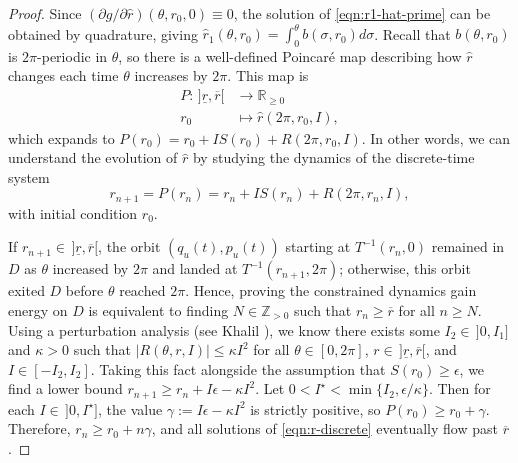 \documentclass[journal,twoside,web, twocolumn,draftcls]{ieeecolor}
\begin{document}
\begin{proof}
    Since \((\partial g/\partial \hat{r})(\theta,r_0,0) \equiv 0\),
    the solution of \eqref{eqn:r1-hat-prime} can be obtained by
    quadrature, giving
    \(\hat{r}_1(\theta,r_0) = \int_0^\theta b(\sigma,r_0)d\sigma\).
    Recall that \(b(\theta,r_0)\) is \(2\pi\)-periodic in
    \(\theta\), so there is a well-defined Poincar\'{e} map describing
    how \(\hat{r}\) changes each time \(\theta\) increases by \(2\pi\).
    This map is 
    \begin{align}\label{eqn:poincare-map}
        P : \, ]\underline{r},\overline{r}[ &\to \mathbb{R}_{\geq 0} \\
        r_0 &\mapsto \hat{r}(2\pi,r_0,I) \nonumber
        ,
    \end{align}
    which expands to \(P(r_0) = r_0 + IS(r_0) + R(2\pi,r_0,I)\).
    In other words, we can understand the evolution of \(\hat{r}\) by studying
    the dynamics of the discrete-time system
    \begin{equation}\label{eqn:r-discrete}
        r_{n+1} = P(r_n) =  r_n + IS(r_n) + R(2\pi,r_n,I)
        ,
    \end{equation}
    with initial condition \(r_0\).

    If \(r_{n+1}\in \, ]\underline{r},\overline{r}[\), the orbit 
    \((q_u(t),p_u(t))\) starting at \(T^{-1}(r_n,0)\) remained in \(D\) as
    \(\theta\) increased by \(2\pi\) and
    landed at \(T^{-1}(r_{n+1},2\pi)\); otherwise, this orbit exited
    \(D\)  before \(\theta\) reached \(2\pi\).
    Hence, proving the constrained dynamics gain energy on \(D\) is
    equivalent to finding \(N \in \mathbb{Z}_{> 0}\) such that 
    \(r_{n} \geq \overline{r}\) for all \(n \geq N\).
    Using a perturbation analysis (see Khalil 
    \cite[Theorem 10.1]{khalil_nonlinear}),
    we know there exists some \(I_2 \in \, ]0,I_1]\) and \(\kappa > 0\)
    such that \(\left|R(\theta,r,I)\right| \leq \kappa I^2\) for all 
    \(\theta \in [0,2\pi]\),
    \(r \in \, ]\underline{r},\overline{r}[\),
    and \(I \in [-I_2,I_2]\).
    Taking this fact alongside the assumption that \(S(r_0) \geq \epsilon\),
    we find a lower bound \(r_{n+1} \geq r_n + I\epsilon - \kappa I^2\).
    Let \(0 < I^\star < \min\{I_2, \epsilon/\kappa\}\).
    Then for each \(I \in \, ]0,I^\star]\), the value 
    \(\gamma := I\epsilon - \kappa I^2\) is strictly positive, so
    \(P(r_0) \geq r_0 + \gamma\).
    Therefore, \(r_{n} \geq r_0 + n\gamma\), 
    and all solutions of \eqref{eqn:r-discrete} eventually flow past
    \(\overline{r}\).


\end{proof}
\end{document}
